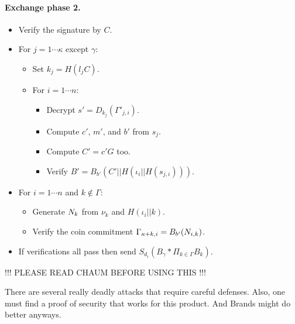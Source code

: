 \documentclass{llncs}
\begin{document}
\paragraph{Exchange phase 2.}
\begin{itemize}
\item  Verify the signature by $C$.
\item  For $j = 1 \cdots \kappa$ except $\gamma$:
   \begin{itemize}
   \item  Set $k_j = H(l_j C)$.
   \item  For $i=1 \cdots n$:
      \begin{itemize}
      \item  Decrypt $s' = D_{k_j}(\Gamma'_{j,i})$.
      \item  Compute $c'$, $m'$, and $b'$ from $s_j$.
      \item  Compute $C' = c' G$ too.
      \item  Verify $B' = B_{b'}(C' || H(\iota_i || H(s_{j,i})))$.
      \end{itemize}
   \end{itemize}
\item  For $i=1 \cdots n$ and $k \not\in \Gamma$:
   \begin{itemize}
   \item  Generate $N_k$ from $\nu_k$ and $H(\iota_i || k)$.
   \item  Verify the coin commitment $\Gamma_{\kappa+k,i} = B_{b'}(N_{i,k})$.
   \end{itemize}
\item  If verifications all pass then send $S_{d_i}(B_\gamma * \Pi_{k \in \Gamma} B_k)$.
\end{itemize}


!!! PLEASE READ CHAUM BEFORE USING THIS !!!

There are several really deadly attacks that require careful defenses.
Also, one must find a proof of security that works for this product.
And Brands might do better anyways. 






\end{document}
